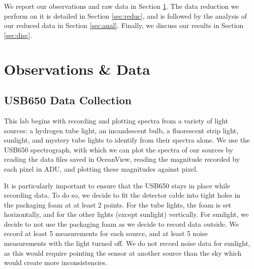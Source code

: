 \documentclass[twocolumn]{aastex702}
\begin{document}
		We report our observations and raw data in Section \ref{sec:obs}. The data reduction we perform on it is detailed in Section \ref{sec:reduc}, and is followed by the analysis of our reduced data in Section \ref{sec:anal}. Finally, we discuss our results in Section \ref{sec:disc}.

  \section{Observations \& Data}\label{sec:obs}

		\subsection{USB650 Data Collection}\label{ssec:USB650-data}
		
			This lab begins with recording and plotting spectra from a variety of light sources: a hydrogen tube light, an incandescent bulb, a fluorescent strip light, sunlight, and mystery tube lights to identify from their spectra alone. We use the USB650 spectrograph, with which we can plot the spectra of our sources by reading the data files saved in OceanView, reading the magnitude recorded by each pixel in ADU, and plotting these magnitudes against pixel.
						
			It is particularly important to ensure that the USB650 stays in place while recording data. To do so, we decide to fit the detector cable into tight holes in the packaging foam at at least 2 points. For the tube lights, the foam is set horizontally, and for the other lights (except sunlight) vertically. For sunlight, we decide to not use the packaging foam as we decide to record data outside. We record at least 5 measurements for each source, and at least 5 noise measurements with the light turned off. We do not record noise data for sunlight, as this would require pointing the sensor at another source than the sky which would create more inconsistencies.
		
\end{document}
